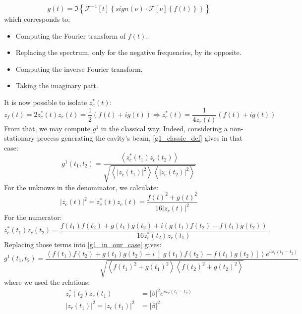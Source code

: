 \documentclass[12pt]{report}
\begin{document}
\begin{equation}
g(t) = \Im \left\lbrace \mathscr{F}^{-1}[t]\left\lbrace sign(\nu) \cdot \mathscr{F}[\nu]\left\lbrace f(t) \right\rbrace \right\rbrace \right\rbrace
\end{equation}
which corresponds to:
\begin{itemize}
	\item Computing the Fourier transform of $f(t)$.
	\item Replacing the spectrum, only for the negative frequencies, by its opposite.
	\item Computing the inverse Fourier transform.
	\item Taking the imaginary part.
\end{itemize}
It is now possible to isolate $z_c^*(t)$:
\begin{equation}
z_f(t) = 2z_c^*(t)z_r(t) = \frac{1}{2} (f(t) + ig(t)) \Rightarrow z_c^*(t) = \frac{1}{4z_r(t)} (f(t) + ig(t))
\end{equation}
From that, we may compute $g^1$ in the classical way. Indeed, considering a non-stationary process generating the cavity's beam, \eqref{g1_classic_def} gives in that case:
\begin{equation}
\label{g1_in_our_case}
g^1(t_1,t_2) = \frac{\left\langle z_c^*(t_1)z_c(t_2) \right\rangle}{\sqrt{\left\langle \vert z_c(t_1) \vert ^2 \right\rangle \left\langle \vert z_c(t_2) \vert ^2 \right\rangle}}
\end{equation}
For the unknows in the denominator, we calculate:
\begin{equation}
\vert z_c(t) \vert ^2 = z_c^*(t)z_c(t) = \frac{f(t)^2 + g(t)^2}{16\vert z_r(t) \vert^2}
\end{equation}
For the numerator:
\begin{equation}
z_c^*(t_1)z_c(t_2) = \frac{f(t_1)f(t_2) + g(t_1)g(t_2) + i (g(t_1)f(t_2) - f(t_1)g(t_2))}{16z_r^*(t_2)z_r(t_1)}
\end{equation}
Replacing those terms into \eqref{g1_in_our_case} gives:
\begin{equation}
g^1(t_1,t_2) = \frac{\left\langle f(t_1)f(t_2) + g(t_1)g(t_2) + i \left]g(t_1)f(t_2) - f(t_1)g(t_2)\right] \right\rangle e^{i\omega_r(t_1 - t_2)}}{\sqrt{\left\langle f(t_1)^2 + g(t_1)^2 \right\rangle \left\langle f(t_2)^2 + g(t_2)^2 \right\rangle}}
\end{equation}
where we used the relations:
\begin{align}
z_r^*(t_2)z_r(t_1) &= \vert \beta \vert^2 e^{i\omega_r(t_1 - t_2)}\\
\vert z_r(t_1) \vert^2 = \vert z_c(t_1) \vert^2 &= \vert \beta \vert^2
\end{align}
\end{document}
